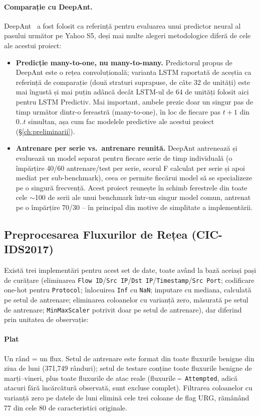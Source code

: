 \paragraph{Comparație cu DeepAnt.} DeepAnt~\parencite{munir2019deepant} a fost folosit ca referință pentru evaluarea unui predictor neural al pasului următor pe Yahoo S5, deși mai multe alegeri metodologice diferă de cele ale acestui proiect:

\begin{itemize}
  \item \textbf{Predicție many-to-one, nu many-to-many.} Predictorul propus de DeepAnt este o rețea convoluțională; varianta LSTM raportată de aceștia ca referință de comparație (două straturi suprapuse, de câte 32 de unități) este mai îngustă și mai puțin adâncă decât LSTM-ul de 64 de unități folosit aici pentru LSTM Predictiv. Mai important, ambele prezic doar un singur pas de timp următor dintr-o fereastră (many-to-one), în loc de fiecare pas $t{+}1$ din $0..t$ simultan, așa cum fac modelele predictive ale acestui proiect (\S\ref{ch:preliminarii}).
  \item \textbf{Antrenare per serie vs.\ antrenare reunită.} DeepAnt antrenează și evaluează un model separat pentru fiecare serie de timp individuală (o împărțire 40/60 antrenare/test per serie, scorul F calculat per serie și apoi mediat per sub-benchmark), ceea ce permite fiecărui model să se specializeze pe o singură frecvență. Acest proiect reunește în schimb ferestrele din toate cele $\sim$100 de serii ale unui benchmark într-un singur model comun, antrenat pe o împărțire 70/30 -- în principal din motive de simplitate a implementării.
\end{itemize}

\subsection{Preprocesarea Fluxurilor de Rețea (CIC-IDS2017)}

Există trei implementări pentru acest set de date, toate având la bază aceiași pași de curățare (eliminarea \texttt{Flow ID}/\texttt{Src IP}/\texttt{Dst IP}/\texttt{Timestamp}/\texttt{Src Port}; codificare one-hot pentru \texttt{Protocol}; înlocuirea \texttt{Inf} cu \texttt{NaN}; imputare cu mediana, calculată pe setul de antrenare; eliminarea coloanelor cu varianță zero, măsurată pe setul de antrenare; \texttt{MinMaxScaler} potrivit doar pe setul de antrenare), dar diferind prin unitatea de observație:

\paragraph{Plat} Un rând = un flux. Setul de antrenare este format din toate fluxurile benigne din ziua de luni (371{,}749 rânduri); setul de testare conține toate fluxurile benigne de marți--vineri, plus toate fluxurile de atac reale (fluxurile \texttt{-- Attempted}, adică atacuri fără încărcătură observată, sunt excluse complet). Filtrarea coloanelor cu varianță zero pe datele de luni elimină cele trei coloane de flag URG, rămânând 77 din cele 80 de caracteristici originale.


